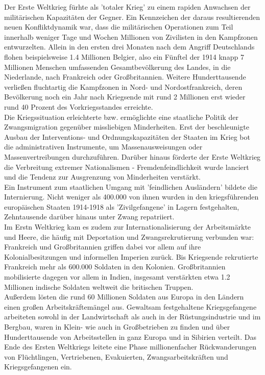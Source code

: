 \documentclass[letterpaper, 12pt]{article}
\begin{document}
Der Erste Weltkrieg fürhte als 'totaler Krieg' zu einem rapiden Anwachsen der militärischen Kapazitäten der Gegner. Ein Kennzeichen der daraus resultierenden neuen Konfliktdynamik war, dass die militärischen Operationen zum Teil innerhalb weniger Tage und Wochen Millionen von Zivilisten in den Kampfzonen entwurzelten. Allein in den ersten drei Monaten nach dem Angriff Deutschlands flohen beispielsweise 1.4 Millionen Belgier, also ein Fünftel der 1914 knapp 7 Millionen Menschen umfassenden Gesamtbevölkerung des Landes, in die Niederlande, nach Frankreich oder Großbritannien. Weitere Hunderttausende verließen fluchtartig die Kampfzonen in Nord- und Nordostfrankreich, deren Bevölkerung noch ein Jahr nach Kriegsende mit rund 2 Millionen erst wieder rund 40 Prozent des Vorkriegsstandes erreichte. \\
Die Kriegssituation erleichterte bzw. ermöglichte eine staatliche Politik der Zwangsmigration gegenüber missliebigen Minderheiten. Erst der beschleunigte Ausbau der Interventions- und Ordnungskapazitäten der Staaten im Krieg bot die administrativen Instrumente, um Massenausweisungen oder Massenvertreibungen durchzuführen. Darüber hinaus förderte der Erste Weltkrieg die Verbreitung extremer Nationalismen - Fremdenfeindlichkeit wurde lanciert und die Tendenz zur Ausgrenzung von Minderheiten verstärkt. \\
Ein Instrument zum staatlichen Umgang mit 'feindlichen Ausländern' bildete die Internierung. Nicht weniger als 400.000 von ihnen wurden in den kriegsführenden europäischen Staaten 1914-1918 als 'Zivilgefangene' in Lagern festgehalten, Zehntausende darüber hinaus unter Zwang repatriiert. \\
Im Erstn Weltkrieg kam es zudem zur Internationalisierung der Arbeitsmärkte und Heere, die häufig mit Deportation und Zwangsrekrutierung verbunden war: Frankreich und Großbritannien griffen dabei vor allem auf ihre Kolonialbesitzungen und informellen Imperien zurück. Bis Kriegsende rekrutierte Frankreich mehr als 600.000 Soldaten in den Kolonien. Großbritannien mobilisierte dagegen vor allem in Indien, insgesamt verstärkten etwa 1.2 Millionen indische Soldaten weltweit die britischen Truppen. \\
Außerdem lösten die rund 60 Millionen Soldaten aus Europa in den Ländern einen großen Arbeitskräftemängel aus. Gewaltsam festgehaltene Kriegsgefangene arbeiteten sowohl in der Landwirtschaft als auch in der Rüstungsindustrie und im Bergbau, waren in Klein- wie auch in Großbetrieben zu finden und über Hunderttausende von Arbeitsstellen in ganz Europa und in Sibirien verteilt. Das Ende des Ersten Weltkriegs leitete eine Phase millionenfacher Rückwanderungen von Flüchtlingen, Vertriebenen, Evakuierten, Zwangsarbeitskräften und Kriegsgefangenen ein.
\end{document}
